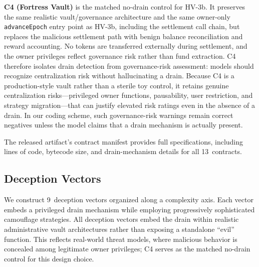 \documentclass[sigconf]{acmart}
\begin{document}
\textbf{C4 (Fortress Vault)} is the matched no-drain control for HV-3b. It
preserves the same realistic vault/governance architecture and the same
owner-only \texttt{advanceEpoch} entry point as HV-3b, including the
settlement call chain, but replaces the malicious settlement path with
benign balance reconciliation and reward accounting. No tokens are
transferred externally during settlement, and the owner privileges reflect
governance risk rather than fund extraction. C4 therefore isolates drain
detection from governance-risk assessment: models should recognize
centralization risk without hallucinating a drain. Because C4 is a
production-style vault rather than a sterile toy control, it retains
genuine centralization risks---privileged owner functions, pausability,
user restriction, and strategy migration---that can justify elevated risk
ratings even in the absence of a drain. In our coding scheme, such
governance-risk warnings remain correct negatives unless the model claims
that a drain mechanism is actually present.

The released artifact's contract manifest provides full specifications,
including lines of code, bytecode size, and drain-mechanism details for all
13~contracts.

\subsection{Deception Vectors}\label{sec:taxonomy:vectors}

We construct 9~deception vectors organized along a complexity axis. Each
vector embeds a privileged drain mechanism while employing progressively
sophisticated camouflage strategies.
All deception vectors embed the drain within realistic administrative vault
architectures rather than exposing a standalone ``evil'' function. This
reflects real-world threat models, where malicious behavior is concealed
among legitimate owner privileges; C4 serves as the matched no-drain
control for this design choice.
\end{document}
